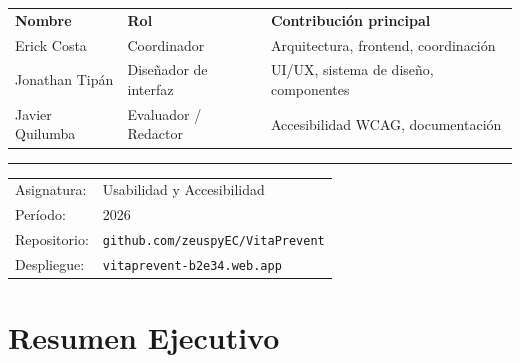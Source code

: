 \documentclass[12pt, a4paper]{report}
\begin{document}
\begin{titlepage}
\begin{flushleft}
\begin{minipage}{0.82\textwidth}
  \vspace{1.6cm}

  \begin{tabular}{@{}lll@{}}
    \color{lightblue}\small\textbf{Nombre} &
    \color{lightblue}\small\textbf{Rol} &
    \color{lightblue}\small\textbf{Contribución principal} \\[4pt]
    \color{white}\small Erick Costa &
    \color{white!80}\small Coordinador &
    \color{white!70}\small Arquitectura, frontend, coordinación \\
    \color{white}\small Jonathan Tipán &
    \color{white!80}\small Diseñador de interfaz &
    \color{white!70}\small UI/UX, sistema de diseño, componentes \\
    \color{white}\small Javier Quilumba &
    \color{white!80}\small Evaluador / Redactor &
    \color{white!70}\small Accesibilidad WCAG, documentación \\
  \end{tabular}

  \vspace{1.8cm}
  {\color{lightblue!40}\rule{0.9\linewidth}{0.4pt}}
  \vspace{0.4cm}

  \begin{tabular}{@{}ll@{}}
    \color{lightblue!70}\small Asignatura: & \color{white!80}\small Usabilidad y Accesibilidad \\
    \color{lightblue!70}\small Período: & \color{white!80}\small 2026 \\
    \color{lightblue!70}\small Repositorio: & \color{royalblue!70}\small \texttt{github.com/zeuspyEC/VitaPrevent} \\
    \color{lightblue!70}\small Despliegue: & \color{royalblue!70}\small \texttt{vitaprevent-b2e34.web.app} \\
  \end{tabular}

\end{minipage}
\end{flushleft}

\end{titlepage}

\nopagecolor
\color{black}

\chapter*{Resumen Ejecutivo}
\end{document}
